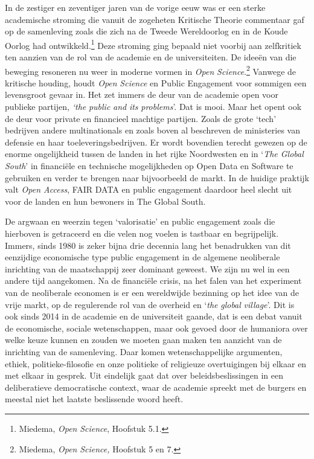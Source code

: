\documentclass[smallauthor, chapterhaspagenum, nochapterinheader, pagenuminheader,  bigchapnum,medium2, tocpages,  garamond, titleinheader]{jote-book}
\begin{document}
	In de zestiger en zeventiger jaren van de vorige eeuw was er een sterke academische stroming die vanuit de zogeheten Kritische Theorie commentaar gaf op de samenleving zoals die zich na de Tweede Wereldoorlog en in de Koude Oorlog had ontwikkeld.\footnote{Miedema, \emph{Open }\emph{Science}, Hoofstuk 5.1.} Deze stroming ging bepaald niet voorbij aan zelfkritiek ten aanzien van de rol van de academie en de universiteiten. De ideeën van die beweging resoneren nu weer in moderne vormen in \emph{Open }\emph{Science}.\footnote{Miedema, \emph{Open }\emph{Science}\emph{, }Hoofstuk 5 en 7.} Vanwege de kritische houding, houdt \emph{Open }\emph{Science} en Public Engagement voor sommigen een levensgroot gevaar in. Het zet immers de deur van de academie open voor publieke partijen, \emph{‘}\emph{the}\emph{ public }\emph{and}\emph{ }\emph{its}\emph{ }\emph{problems}'. Dat is mooi. Maar het opent ook de deur voor private en financieel machtige partijen. Zoals de grote ‘tech' bedrijven andere multinationals en zoals boven al beschreven de ministeries van defensie en haar toeleveringsbedrijven. Er wordt bovendien terecht gewezen op de enorme ongelijkheid tussen de landen in het rijke Noordwesten en in ‘\emph{The Global South}' in financiële en technische mogelijkheden op Open Data en Software te gebruiken en verder te brengen naar bijvoorbeeld de markt. In de huidige praktijk valt \emph{Open Access}, FAIR DATA en public engagement daardoor heel slecht uit voor de landen en hun bewoners in The Global South.



	De argwaan en weerzin tegen ‘valorisatie' en public engagement zoals die hierboven is getraceerd en die velen nog voelen is tastbaar en begrijpelijk. Immers, sinds 1980 is zeker bijna drie decennia lang het benadrukken van dit eenzijdige economische type public engagement in de algemene neoliberale inrichting van de maatschappij zeer dominant geweest. We zijn nu wel in een andere tijd aangekomen. Na de financiële crisis, na het falen van het experiment van de neoliberale economen is er een wereldwijde bezinning op het idee van de vrije markt, op de regulerende rol van de overheid en ‘\emph{the}\emph{ }\emph{global}\emph{ }\emph{village}'. Dit is ook sinds 2014 in de academie en de universiteit gaande, dat is een debat vanuit de economische, sociale wetenschappen, maar ook gevoed door de humaniora over welke keuze kunnen en zouden we moeten gaan maken ten aanzicht van de inrichting van de samenleving. Daar komen wetenschappelijke argumenten, ethiek, politieke-filosofie en onze politieke of religieuze overtuigingen bij elkaar en met elkaar in gesprek. Uit eindelijk gaat dat over beleidsbeslissingen in een deliberatieve democratische context, waar de academie spreekt met de burgers en meestal niet het laatste beslissende woord heeft.
\end{document}
